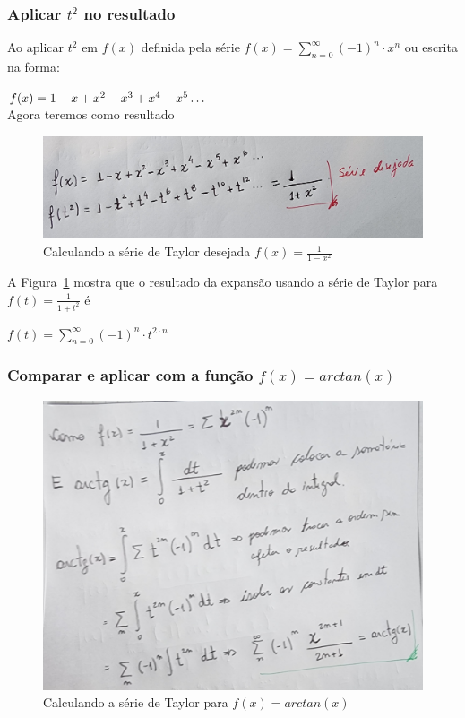\newpage
\subsubsection{Aplicar $t^2$ no resultado}

Ao aplicar $t^2$ em $f(x)$ definida pela série $f(x) = \sum_{n=0}^{\infty} (-1)^n \cdot x^n $ ou escrita na forma:

$f(x) = 1 - x + x^2 - x^3 + x^4 - x^5 \mathellipsis $ \\
Agora teremos como resultado

\begin{figure}[H]
    \centering
    \includegraphics[width=1.0\textwidth]{imagens/exercicio4_parte2}
    \caption{Calculando a série de Taylor desejada $f(x) = \frac{1}{1 - x^2}$}
    \label{fig:exe4_parte2}
\end{figure}

A Figura~\ref{fig:exe4_parte2} mostra que o resultado da expansão usando a série de Taylor para $f(t) = \frac{1}{1 + t^2}$ é

$f(t) = \sum_{n=0}^{\infty} (-1)^n \cdot t^{2 \cdot n}$

\subsubsection{Comparar e aplicar com a função $f(x) = arctan(x)$}

\begin{figure}[H]
    \centering
    \includegraphics[width=1.0\textwidth]{imagens/exercicio4_parte3}
    \caption{Calculando a série de Taylor para $f(x) = arctan(x)$}
    \label{fig:exe4_parte3}
\end{figure}

